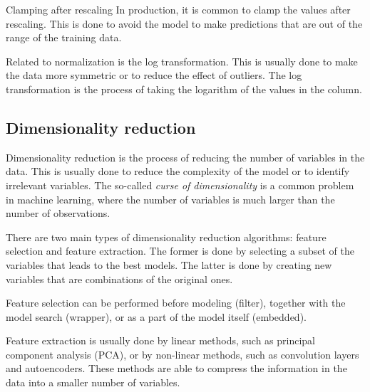 \begin{hlbox}{Clamping after rescaling}
  In production, it is common to clamp the values after rescaling.  This is done to avoid
  the model to make predictions that are out of the range of the training data.
\end{hlbox}

Related to normalization is the log transformation.  This is usually done to make the data
more symmetric or to reduce the effect of outliers.  The log transformation is the process
of taking the logarithm of the values in the column.


\subsection{Dimensionality reduction}

Dimensionality reduction is the process of reducing the number of variables in the data.
This is usually done to reduce the complexity of the model or to identify irrelevant
variables.  The so-called \emph{curse of dimensionality} is a common problem in machine
learning, where the number of variables is much larger than the number of observations.

There are two main types of dimensionality reduction algorithms: feature selection and
feature extraction.  The former is done by selecting a subset of the variables that leads
to the best models.  The latter is done by creating new variables that are combinations
of the original ones.

Feature selection can be performed before modeling (filter), together with the model
search (wrapper), or as a part of the model itself (embedded).

Feature extraction is usually done by linear methods, such as principal component analysis
(PCA), or by non-linear methods, such as convolution layers and autoencoders.  These methods are able to
compress the information in the data into a smaller number of variables.

